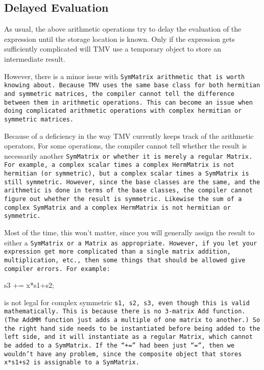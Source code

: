 \subsection{Delayed Evaluation}

As usual, the above arithmetic operations try to delay the evaluation 
of the expression until the storage location is known.  Only if the 
expression gets sufficiently complicated will TMV use a temporary
object to store an intermediate result.

However, there is a minor issue with \tt{SymMatrix} arithmetic that is
worth knowing about.
Because TMV uses the same base class for both hermitian and symmetric
matrices, the compiler cannot tell the difference between them in arithmetic
operations.  
This can become an issue when doing complicated arithmetic operations
with complex hermitian or symmetric matrices.

Because of a deficiency in the way TMV currently keeps track of the 
arithmetic operators, For some operations, the compiler cannot tell whether the result is
necessarily another \tt{SymMatrix} or whether it is merely a regular
\tt{Matrix}.
For example, a complex scalar times a complex \tt{HermMatrix} is not 
hermitian (or symmetric), but a complex scalar times a \tt{SymMatrix}
is still symmetric.  However, since the base classes are the same, and the 
arithmetic is done in terms of the base classes, the compiler cannot
figure out whether the result is symmetric.
Likewise the sum of a complex \tt{SymMatrix} and a complex \tt{HermMatrix} is not hermitian or symmetric.

Most of the time, this won't matter, since
you will generally assign the result to either a \tt{SymMatrix} or a \tt{Matrix}
as appropriate.  However, if you let your expression get more complicated than a single
matrix addition, multiplication, etc., then some things that should be allowed give compiler errors.
For example:
\begin{tmvcode}
s3 += x*s1+s2;
\end{tmvcode}
is not legal for complex symmetric \tt{s1, s2, s3}, even though this is valid mathematically.
This is because there is no 3-matrix 
\tt{Add} function.  (The \tt{AddMM} function just adds a multiple of one 
matrix to another.)  So the right hand side needs to be instantiated before
being added to the left side, and it will instantiate as a regular \tt{Matrix},
which cannot be added to a \tt{SymMatrix}.  
If the ``\tt{+=}'' had been just ``\tt{=}'', then we wouldn't have any problem,
since the composite object that stores \tt{x*s1+s2} is assignable to a \tt{SymMatrix}.

